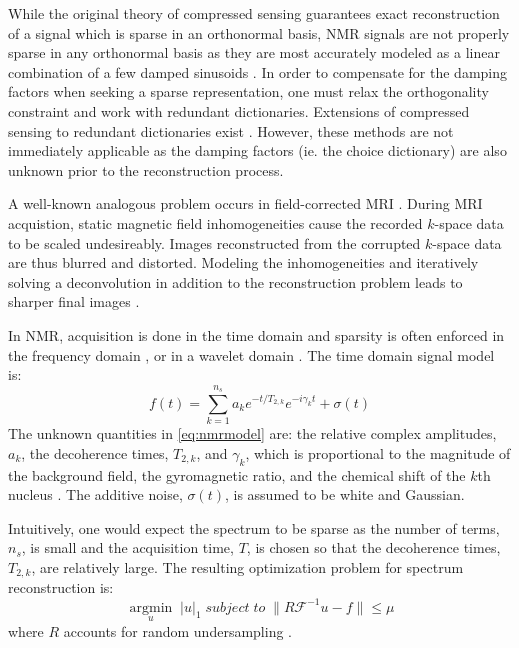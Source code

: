 \documentclass[11pt]{article}
\begin{document}
While the original theory of compressed sensing guarantees exact reconstruction of a signal which is sparse in an orthonormal basis, NMR signals are not properly sparse in any orthonormal basis as they are most accurately modeled as a linear combination of a few damped sinusoids \cite{Hoch1996}. In order to compensate for the damping factors when seeking a sparse representation, one must relax the orthogonality constraint and work with redundant dictionaries. Extensions of compressed sensing to redundant dictionaries exist \cite{Rauhut2008} \cite{Cand2010b}. However, these methods are not immediately applicable as the damping factors (ie. the choice dictionary) are also unknown prior to the reconstruction process.

A well-known analogous problem occurs in field-corrected MRI \cite{Fessler2010}. During MRI acquistion, static magnetic field inhomogeneities cause the recorded $k$-space data to be scaled undesireably. Images reconstructed from the corrupted $k$-space data are thus blurred and distorted. Modeling the inhomogeneities and iteratively solving a deconvolution in addition to the reconstruction problem leads to sharper final images \cite{Compton2012}.

In NMR, acquisition is done in the time domain and sparsity is often enforced in the frequency domain \cite{Qu2011}, or in a wavelet domain \cite{Drori2007a}. The time domain signal model is:
\begin{equation}\label{eq:nmrmodel}
f(t) = \sum_{k=1}^{n_s} a_k e^{-t/T_{2,k}}e^{-i \gamma_k t}+ \sigma(t)
\end{equation}
The unknown quantities in \cref{eq:nmrmodel} are: the relative complex amplitudes, $a_k$, the decoherence times, $T_{2,k}$, and $\gamma_k$, which is proportional to the magnitude of the background field, the gyromagnetic ratio, and the chemical shift of the $k$th nucleus \cite{Granwehr2007}. The additive noise, $\sigma(t)$, is assumed to be white and Gaussian.

Intuitively, one would expect the spectrum to be sparse as the number of terms, $n_s$, is small and the acquisition time, $T$, is chosen so that the decoherence times, $T_{2,k}$, are relatively large. The resulting optimization problem for spectrum reconstruction is:
\begin{equation}\label{eq:oldcs}
\underset{u}{\operatorname{argmin}} \; |u|_1 \; subject\;to \; \| R\mathcal{F}^{-1}u - f \| \leq \mu
\end{equation}
where $R$ accounts for random undersampling \cite{Candes2006}.
\end{document}
